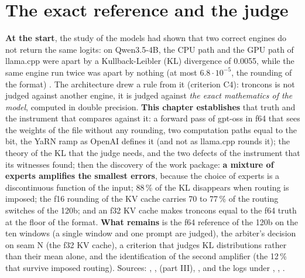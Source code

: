 \ifdefined\GrapheRefRampe\else\fi

\chapter{The exact reference and the judge}\label{ch:t2-reference}

\begin{origine}
\textbf{At the start}, the study of the models had shown that two correct engines do not return the same logits: on Qwen3.5-4B, the CPU path and the GPU path of llama.cpp were apart by a Kullback-Leibler (KL) divergence of 0.0055, while the same engine run twice was apart by nothing (at most $6.8\cdot10^{-5}$, the rounding of the format) \mes. The architecture drew a rule from it (criterion C4): troncons is not judged against another engine, it is judged against \emph{the exact mathematics of the model}, computed in double precision.
\textbf{This chapter establishes} that truth and the instrument that compares against it: a forward pass of gpt-oss in f64 that sees the weights of the file without any rounding, two computation paths equal to the bit, the YaRN ramp as OpenAI defines it (and not as llama.cpp rounds it); the theory of the KL that the judge needs, and the two defects of the instrument that its witnesses found; then the discovery of the work package: \textbf{a mixture of experts amplifies the smallest errors}, because the choice of experts is a discontinuous function of the input; 88\,\% of the KL disappears when routing is imposed; the f16 rounding of the KV cache carries 70 to 77\,\% of the routing switches of the 120b; and an f32 KV cache makes troncons equal to the f64 truth at the floor of the format.
\textbf{What remains} is the f64 reference of the 120b on the ten windows (a single window and one prompt are judged), the arbiter's decision on seam N (the f32 KV cache), a criterion that judges KL distributions rather than their mean alone, and the identification of the second amplifier (the 12\,\% that survive imposed routing).
Sources: , ,  (part III), , and the logs under , , .
\end{origine}

